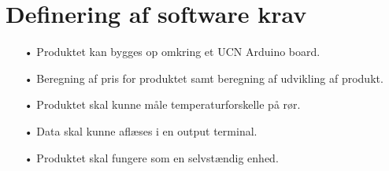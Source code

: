 \section{Definering af software krav}
\begin{enumerate}
	\item[•]Produktet kan bygges op omkring et UCN Arduino board.
	\item[•]Beregning af pris for produktet samt beregning af udvikling af       produkt.
	\item[•]Produktet skal kunne måle temperaturforskelle på rør.
	\item[•]Data skal kunne aflæses i en output terminal.
	\item[•]Produktet skal fungere som en selvstændig enhed.
\end{enumerate}
